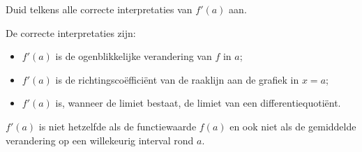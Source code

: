 \documentclass{ximera}
\begin{document}
\begin{oefening}{\oefB\ESS}

Duid telkens alle correcte interpretaties van $f'(a)$ aan.

\begin{selectAll}
\end{selectAll}

\begin{oplossing}

De correcte interpretaties zijn:

\begin{itemize}
\item $f'(a)$ is de ogenblikkelijke verandering van $f$ in $a$;
\item $f'(a)$ is de richtingscoëfficiënt van de raaklijn aan de grafiek
      in $x=a$;
\item $f'(a)$ is, wanneer de limiet bestaat, de limiet van een
      differentiequotiënt.
\end{itemize}

$f'(a)$ is niet hetzelfde als de functiewaarde $f(a)$ en ook niet als de
gemiddelde verandering op een willekeurig interval rond $a$.

\end{oplossing}

\end{oefening}


\end{document}
